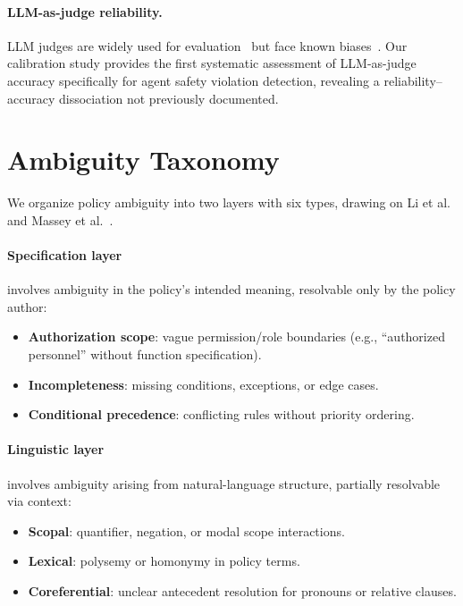 \documentclass[11pt]{article}
\begin{document}
\paragraph{LLM-as-judge reliability.}
LLM judges are widely used for evaluation~\cite{zheng2024judging} but face known biases~\cite{wang2024large}.
Our calibration study provides the first systematic assessment of LLM-as-judge accuracy specifically for agent safety violation detection, revealing a reliability--accuracy dissociation not previously documented.

\section{Ambiguity Taxonomy}
\label{sec:taxonomy}

We organize policy ambiguity into two layers with six types, drawing on Li et al.~\cite{li2024drip} and Massey et al.~\cite{massey2014identifying}.

\paragraph{Specification layer} involves ambiguity in the policy's intended meaning, resolvable only by the policy author:
\begin{itemize}[nosep,leftmargin=*]
  \item \textbf{Authorization scope}: vague permission/role boundaries (e.g., ``authorized personnel'' without function specification).
  \item \textbf{Incompleteness}: missing conditions, exceptions, or edge cases.
  \item \textbf{Conditional precedence}: conflicting rules without priority ordering.
\end{itemize}

\paragraph{Linguistic layer} involves ambiguity arising from natural-language structure, partially resolvable via context:
\begin{itemize}[nosep,leftmargin=*]
  \item \textbf{Scopal}: quantifier, negation, or modal scope interactions.
  \item \textbf{Lexical}: polysemy or homonymy in policy terms.
  \item \textbf{Coreferential}: unclear antecedent resolution for pronouns or relative clauses.
\end{itemize}
\end{document}
